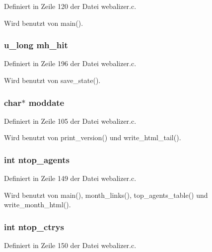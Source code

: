 Definiert in Zeile 120 der Datei webalizer.c.

Wird benutzt von main().
\subsubsection{\setlength{\rightskip}{0pt plus 5cm}u\_\-long {\bf mh\_\-hit}}\label{webalizer_8h_0fbe52a528ae909f4058a35bdab8d034}




Definiert in Zeile 196 der Datei webalizer.c.

Wird benutzt von save\_\-state().
\subsubsection{\setlength{\rightskip}{0pt plus 5cm}char$\ast$ {\bf moddate}}\label{webalizer_8h_c000a634d0e3be8405dde288f429e91a}




Definiert in Zeile 105 der Datei webalizer.c.

Wird benutzt von print\_\-version() und write\_\-html\_\-tail().
\subsubsection{\setlength{\rightskip}{0pt plus 5cm}int {\bf ntop\_\-agents}}\label{webalizer_8h_09d5297ba12ba78e65bcb4679036de17}




Definiert in Zeile 149 der Datei webalizer.c.

Wird benutzt von main(), month\_\-links(), top\_\-agents\_\-table() und write\_\-month\_\-html().
\subsubsection{\setlength{\rightskip}{0pt plus 5cm}int {\bf ntop\_\-ctrys}}\label{webalizer_8h_fcd390bd7df1e721799f33f0ac87fdaf}




Definiert in Zeile 150 der Datei webalizer.c.

